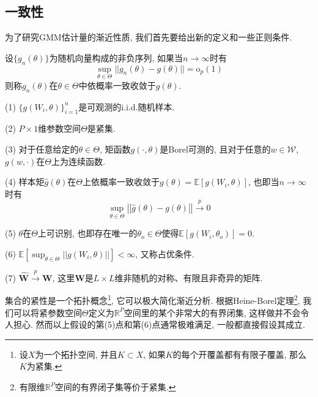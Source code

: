\documentclass[cn, 12pt, math=mtpro2, bibstyle=apa, blue, twocol]{elegantbook}
\newcommand{\R}{\mathbb{R}}
\newcommand{\E}{\mathbb{E}}
\newcommand{\W}{\mathbold{W}}
\begin{document}
\subsection{一致性}
为了研究GMM估计量的渐近性质, 我们首先要给出新的定义和一些正则条件.
\begin{definition}
设$\{g_n(\theta)\}$为随机向量构成的非负序列, 如果当$n\to\infty$时有
$$\sup_{\theta\in\Theta}||g_n(\theta)-g(\theta)||=\text{o}_p(1)$$
则称$g_n(\theta)$在$\theta\in\Theta$中依概率一致收敛于$g(\theta)$.
\end{definition}
\begin{proposition}\label{pro:pro7.1}
(1) $\{g(W_i,\theta)\}_{i=1}^n$是可观测的i.i.d.随机样本.

(2) $P\times1$维参数空间$\Theta$是紧集.

(3) 对于任意给定的$\theta\in\Theta$, 矩函数$g(\cdot,\theta)$是Borel可测的, 且对于任意的$w\in\mathscr{W}$, $g(w,\cdot)$在$\Theta$上为连续函数.

(4) 样本矩$\hat{g}(\theta)$在$\Theta$上依概率一致收敛于$g(\theta)=\E[g(W_i,\theta)]$, 也即当$n\to\infty$时有
$$\sup_{\theta\in\Theta}\left|\left|\hat{g}(\theta)-g(\theta)\right|\right|\xrightarrow{p}0$$

(5) $\theta$在$\Theta$上可识别, 也即存在唯一的$\theta_o\in\Theta$使得$\E[g(W_i,\theta_o)]=0$.

(6) $\E\left[\sup_{\theta\in\Theta}||g(W_i,\theta)||\right]<\infty$, 又称占优条件.

(7) $\hat{\W}\xrightarrow{p}\W$, 这里$\W$是$L\times L$维非随机的对称、有限且非奇异的矩阵.
\end{proposition}
集合的紧性是一个拓扑概念\footnote{设$X$为一个拓扑空间, 并且$K\subset X$, 如果$K$的每个开覆盖都有有限子覆盖, 那么$K$为紧集.}, 它可以极大简化渐近分析. 根据Heine-Borel定理\footnote{有限维$\R^P$空间的有界闭子集等价于紧集.}, 我们可以将紧参数空间$\Theta$定义为$\R^P$空间里的某个非常大的有界闭集, 这样做并不会令人担心. 然而以上假设的第(5)点和第(6)点通常极难满足, 一般都直接假设其成立.
\end{document}
